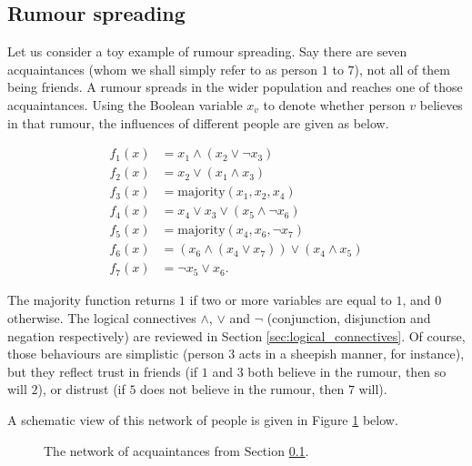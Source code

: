 \documentclass[a4paper, 11pt]{book}
\numberwithin{equation}{section}
\theoremstyle{plain}
\renewcommand{\(}{\ldbrack}
\renewcommand{\)}{\rdbrack}
\begin{document}
\subsection{Rumour spreading} \label{sec:rumour}

Let us consider a toy example of rumour spreading. Say there are seven acquaintances (whom we shall simply refer to as person $1$ to $7$), not all of them being friends. A rumour spreads in the wider population and reaches one of those acquaintances. Using the Boolean variable $x_v$ to denote whether person $v$ believes in that rumour, the influences of different people are given as below.

\begin{align*}
	f_1(x) &= x_1 \land (x_2 \lor \neg x_3)\\
	f_2(x) &= x_2 \lor (x_1 \land x_3)\\
	f_3(x) &= \mathrm{majority}( x_1, x_2, x_4 )\\
	f_4(x) &= x_4 \lor x_3 \lor (x_5 \land \neg x_6)\\
	f_5(x) &= \mathrm{majority}( x_4, x_6, \neg x_7 )\\
	f_6(x) &= \left( x_6 \land ( x_4 \lor x_7 ) \right) \lor ( x_4 \land x_5 )\\
	f_7(x) &= \neg x_5 \lor x_6.
\end{align*}

The majority function returns $1$ if two or more variables are equal to $1$, and $0$ otherwise. The logical connectives $\land$, $\lor$ and $\neg$ (conjunction, disjunction and negation respectively) are reviewed in Section \ref{sec:logical_connectives}. Of course, those behaviours are simplistic (person $3$ acts in a sheepish manner, for instance), but they reflect trust in friends (if $1$ and $3$ both believe in the rumour, then so will $2$), or distrust (if $5$ does not believe in the rumour, then $7$ will).

A schematic view of this network of people is given in Figure \ref{fig:rumour_IG} below.

\begin{figure}
\centering
{}
\caption{The network of acquaintances from Section \ref{sec:rumour}.} \label{fig:rumour_IG}
\end{figure}
\end{document}
